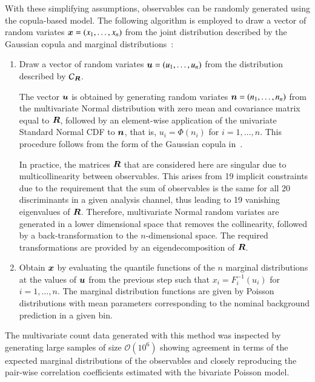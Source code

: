 With these simplifying assumptions, observables can be randomly generated using
the copula-based model. The following algorithm is employed to draw a vector of
random variates $\bm{x} = (x_1, \dots, x_n)$ from the joint distribution
described by the Gaussian copula and marginal distributions~\cite{nelsen}:
\begin{enumerate}

\item Draw a vector of random variates $\bm{u} = (u_1, \dots, u_n)$ from the
  distribution described by $\mathcal{C}_{\bm{R}}$.

  The vector $\bm{u}$ is obtained by generating random variates
  $\bm{n} = (n_1, \dots, n_n)$ from the multivariate Normal distribution with
  zero mean and covariance matrix equal to $\bm{R}$, followed by an
  element-wise application of the univariate Standard Normal CDF to $\bm{n}$,
  that is, $u_i = \Phi(n_i)$ for $i = 1, \dots, n$. This procedure follows from
  the form of the Gaussian copula in~.

  In practice, the matrices $\bm{R}$ that are considered here are singular
  due to multicollinearity between observables. This arises from 19 implicit
  constraints due to the requirement that the sum of observables is the same for
  all 20 discriminants in a given analysis channel, thus leading to 19 vanishing
  eigenvalues of $\bm{R}$. Therefore, multivariate Normal random variates are
  generated in a lower dimensional space that removes the collinearity, followed
  by a back-transformation to the $n$-dimensional space. The required
  transformations are provided by an eigendecomposition of $\bm{R}$.

\item Obtain $\bm{x}$ by evaluating the quantile functions of the $n$
  marginal distributions at the values of $\bm{u}$ from the previous step
  such that $x_i = F_{i}^{-1}(u_i)$ for $i = 1, \dots, n$. The marginal
  distribution functions are given by Poisson distributions with mean parameters
  corresponding to the nominal background prediction in a given bin.

\end{enumerate}
The multivariate count data generated with this method was inspected by
generating large samples of size $\mathcal{O}(10^6)$ showing agreement in terms
of the expected marginal distributions of the observables and closely
reproducing the pair-wise correlation coefficients estimated with the bivariate
Poisson model.


